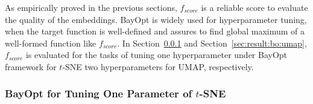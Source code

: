 As empirically proved in the previous sections, $f_{score}$ is a reliable score to evaluate the quality of the embeddings.
BayOpt is widely used for hyperparameter tuning, when the target function is well-defined and assures to find global maximum of a well-formed function like $f_{score}$.
In Section~\ref{sec:result:bo:tsne} and Section~\ref{sec:result:bo:umap}, $f_{score}$ is evaluated for the tasks of tuning one hyperparameter under BayOpt framework for $t$-SNE two hyperparameters for UMAP, respectively.

\subsubsection{BayOpt for Tuning One Parameter of $t$-SNE}\label{sec:result:bo:tsne}

